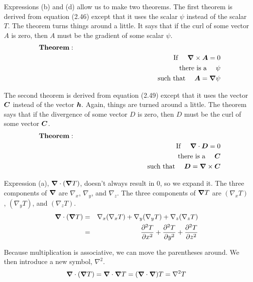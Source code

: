 \newpage
Expressions (b) and (d) allow us to make two theorems.
The first theorem is derived from equation (2.46)
except that it uses the scalar $\psi$ instead of the scalar $T$.
The theorem turns things around a little.
It says that if the curl of some vector $A$ is zero,
then $A$ must be the gradient of some scalar $\psi$.
\begin{eqnarray}
  & &  \mathbf{Theorem:} \phantom{XXXXXXXXXXXXXXXXXXXXXXXX} \nonumber\\
  & &  \mathrm{If\ } \quad \boldsymbol{\nabla} \times \boldsymbol{A} = 0 \nonumber\\
  & &  \mathrm{there\ is\ a\ } \quad \psi \nonumber\\
  & &  \mathrm{such\ that\ } \quad \boldsymbol{A} = \boldsymbol{\nabla} \psi
\end{eqnarray}

The second theorem is derived from equation (2.49)
except that it uses the vector $\boldsymbol{C}$ instead of the vector $\boldsymbol{h}$.
Again, things are turned around a little.
The theorem says that if the divergence of some vector $D$ is zero,
then $D$ must be the curl of some vector $\boldsymbol{C}$.
\begin{eqnarray}
  & &  \mathbf{Theorem:} \phantom{XXXXXXXXXXXXXXXXXXXXXXXX} \nonumber\\
  & &  \mathrm{If\ } \quad \boldsymbol{\nabla} \cdot \boldsymbol{D} = 0 \nonumber\\
  & &  \mathrm{there\ is\ a\ } \quad \boldsymbol{C} \nonumber\\
  & &  \mathrm{such\ that\ } \quad \boldsymbol{D} = \boldsymbol{\nabla} \times \boldsymbol{C}
\end{eqnarray}

Expression (a), $\boldsymbol{\nabla} \cdot (\boldsymbol{\nabla} T)$, doesn't always result in 0, so we expand it.
The three components of $\boldsymbol{\nabla}$ are $\nabla_x$, $\nabla_y$, and $\nabla_z$.
The three components of $\boldsymbol{\nabla} T$ are $(\nabla_x T)$, $(\nabla_y T)$, and $(\nabla_z T)$.
\begin{eqnarray}
  \boldsymbol{\nabla} \cdot (\boldsymbol{\nabla} T)
  &=& \nabla_x ( \nabla_x T) + \nabla_y ( \nabla_y T) + \nabla_z ( \nabla_z T) \nonumber \\
  &=& \frac{\partial ^2T}{\partial x^2} + \frac{\partial ^2T}{\partial y^2} + \frac{\partial ^2T}{\partial z^2}
\end{eqnarray}

Because multiplication is associative, we can move the parentheses around.
We then introduce a new symbol, $\nabla^2$.
\begin{equation}
  \boldsymbol{\nabla} \cdot (\boldsymbol{\nabla} T) = \boldsymbol{\nabla} \cdot \boldsymbol{\nabla} T = (\boldsymbol{\nabla} \cdot \boldsymbol{\nabla}) T = \nabla^2 T
\end{equation}

